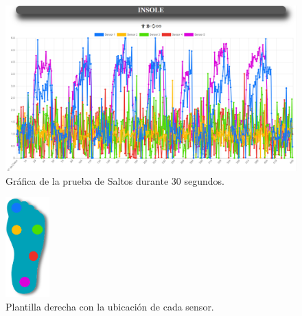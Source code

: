 

\begin{figure}[H]
\centering
\includegraphics[width=1\textwidth]{./image/Insoleapp.png}
\caption{Gráfica de la prueba de Saltos durante 30 segundos.}
\label{fig:Grafica_Saltos}
\end{figure}

\begin{figure}
\centering
\includegraphics[width=0.15\textwidth]{./image/Plantilla_Derecha.png}
\caption{Plantilla derecha con la ubicación de cada sensor.}
\label{fig:Plantilla_derecha}
\end{figure}

